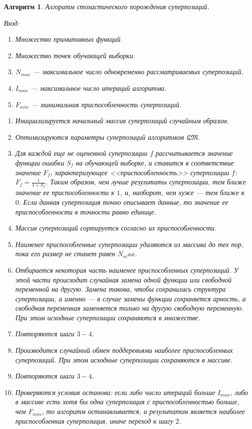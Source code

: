 \documentclass[12pt,a4paper]{amsart}
\newtheorem{algo}{Алгоритм}
\begin{document}
\begin{algo}
  Алгоритм стохастического порождения суперпозиций.

  Вход:
  \begin{enumerate}
	\item Множество примитивных функций.
	\item Множество точек обучающей выборки.
	\item $N_{max}$ --- максимальное число одновременно рассматриваемых
	  суперпозиций.
	\item $I_{max}$ --- максимальное число итераций алгоритма.
	\item $F_{min}$ --- минимальная приспособленность суперпозиций.
  \end{enumerate}

  \begin{enumerate}
	\item Инициализируется начальный массив суперпозиций случайным образом.
	\item Оптимизируются параметры суперпозиций алгоритмом $\mathfrak{LM}$.
	\item Для каждой еще не оцененной суперпозиции $f$ рассчитывается значение
	  функции ошибки $S_f$ на обучающей выборке, и ставится в соответствие
	  значение $F_f$, характеризующее <<приспособленность>> суперпозиции $f$:
	  $F_f = \frac{1}{1 + S_f}$. Таким образом, чем лучше результаты суперпозиции,
	  тем ближе значение ее приспособленности к $1$, и, наоборот, чем хуже ---
	  тем ближе к $0$. Если данная суперпозиция точно описывает данные, то
	  значение ее приспособленности в точности равно единице.
	\item Массив суперпозиций сортируется согласно их приспособленности.
	\item Наименее приспособленные суперпозиции удаляются из массива до тех
	  пор, пока его размер не станет равен $N_max$.
	\item Отбирается некоторая часть наименее приспособленных суперпозиций.
	  У этой части происходит случайная замена одной функции или свободной
	  переменной на другую. Замена такова, чтобы сохранилась структура
	  суперпозиции, а именно --- в случае замены функции сохраняется арность,
	  а свободная переменная заменяется только на другую свободную переменную.
	  При этом исходные суперпозиции сохраняются в множестве.
	\item Повторяются шаги $3-4$.
	\item Производится случайный обмен поддеревьями наиболее приспособленных
	  суперпозиций. При этом исходные суперпозиции сохраняются в массиве.
	\item Повторяются шаги $3-4$.
	\item Проверяются условия останова: если либо число итераций больше
	  $I_{max}$, либо в массиве есть хотя бы одна суперпозиция с
	  приспособленностью больше, чем $F_{min}$, то алгоритм останавливается,
	  и результатом является наиболее приспособленная суперпозиция, иначе
	  переход к шагу $2$.
  \end{enumerate}
\end{algo}


\extrasrussian

\end{document}
